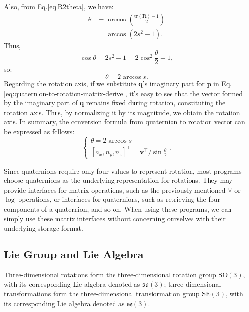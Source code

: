 Also, from Eq.\eqref{eq:R2theta}, we have:
\begin{equation}
	\begin{aligned}
		\theta &= \arccos(\frac{\mathrm{tr}(\mathbf{R})-1}{2}) \\
		&=\arccos(2s^2-1).
	\end{aligned}
\end{equation}
Thus,
\begin{equation}
	\cos \theta =2s^2-1=2 \cos^2 \frac{\theta}{2} -1,
\end{equation}
so:
\begin{equation}
	\theta = 2 \arccos s.
\end{equation}
Regarding the rotation axis, if we substitute $\mathbf{q}$'s imaginary part for $\mathbf{p}$ in Eq.\eqref{eq:quaternion-to-rotation-matrix-derive}, it's easy to see that the vector formed by the imaginary part of $\mathbf{q}$ remains fixed during rotation, constituting the rotation axis. Thus, by normalizing it by its magnitude, we obtain the rotation axis. In summary, the conversion formula from quaternion to rotation vector can be expressed as follows:
\begin{equation}
	\label{eq:rotationVector2Quaternion}
	\begin{cases}
		\theta  = 2\arccos s\\
		{\left[ {{n_x},{n_y},{n_z}} \right]^\top} = \mathbf{v}^\top /{\sin 
			\frac{\theta }{2}}
	\end{cases} .
\end{equation}

Since quaternions require only four values to represent rotation, most programs choose quaternions as the underlying representation for rotations. They may provide interfaces for matrix operations, such as the previously mentioned $\vee$ or $\log$ operations, or interfaces for quaternions, such as retrieving the four components of a quaternion, and so on. When using these programs, we can simply use these matrix interfaces without concerning ourselves with their underlying storage format.

\subsection{Lie Group and Lie Algebra}
Three-dimensional rotations form the three-dimensional rotation group $\mathrm{SO}(3)$, with its corresponding Lie algebra denoted as $\mathfrak{so}(3)$; three-dimensional transformations form the three-dimensional transformation group $\mathrm{SE}(3)$, with its corresponding Lie algebra denoted as $\mathfrak{se}(3)$.

